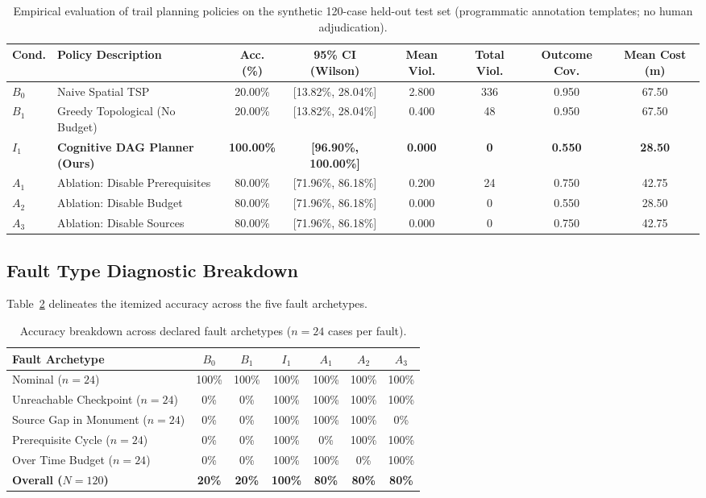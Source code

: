 \documentclass[11pt,a4paper]{article}
\begin{document}
\begin{table}[t]
\centering
\small
\caption{Empirical evaluation of trail planning policies on the synthetic 120-case held-out test set (programmatic annotation templates; no human adjudication).}
\label{tab:holdout_results}
\begin{tabular}{llcccccc}
\toprule
\textbf{Cond.} & \textbf{Policy Description} & \textbf{Acc. (\%)} & \textbf{95\% CI (Wilson)} & \textbf{Mean Viol.} & \textbf{Total Viol.} & \textbf{Outcome Cov.} & \textbf{Mean Cost (m)} \\
\midrule
$B_0$ & Naive Spatial TSP & 20.00\% & [13.82\%, 28.04\%] & 2.800 & 336 & 0.950 & 67.50 \\
$B_1$ & Greedy Topological (No Budget) & 20.00\% & [13.82\%, 28.04\%] & 0.400 & 48 & 0.950 & 67.50 \\
\textbf{$I_1$} & \textbf{Cognitive DAG Planner (Ours)} & \textbf{100.00\%} & \textbf{[96.90\%, 100.00\%]} & \textbf{0.000} & \textbf{0} & \textbf{0.550} & \textbf{28.50} \\
$A_1$ & Ablation: Disable Prerequisites & 80.00\% & [71.96\%, 86.18\%] & 0.200 & 24 & 0.750 & 42.75 \\
$A_2$ & Ablation: Disable Budget & 80.00\% & [71.96\%, 86.18\%] & 0.000 & 0 & 0.550 & 28.50 \\
$A_3$ & Ablation: Disable Sources & 80.00\% & [71.96\%, 86.18\%] & 0.000 & 0 & 0.750 & 42.75 \\
\bottomrule
\end{tabular}
\end{table}

\subsection{Fault Type Diagnostic Breakdown}
Table~\ref{tab:fault_breakdown} delineates the itemized accuracy across the five fault archetypes.

\begin{table}[ht]
\centering
\small
\caption{Accuracy breakdown across declared fault archetypes ($n=24$ cases per fault).}
\label{tab:fault_breakdown}
\begin{tabular}{lcccccc}
\toprule
\textbf{Fault Archetype} & \textbf{$B_0$} & \textbf{$B_1$} & \textbf{$I_1$} & \textbf{$A_1$} & \textbf{$A_2$} & \textbf{$A_3$} \\
\midrule
Nominal ($n=24$) & 100\% & 100\% & 100\% & 100\% & 100\% & 100\% \\
Unreachable Checkpoint ($n=24$) & 0\% & 0\% & 100\% & 100\% & 100\% & 100\% \\
Source Gap in Monument ($n=24$) & 0\% & 0\% & 100\% & 100\% & 100\% & 0\% \\
Prerequisite Cycle ($n=24$) & 0\% & 0\% & 100\% & 0\% & 100\% & 100\% \\
Over Time Budget ($n=24$) & 0\% & 0\% & 100\% & 100\% & 0\% & 100\% \\
\midrule
\textbf{Overall ($N=120$)} & \textbf{20\%} & \textbf{20\%} & \textbf{100\%} & \textbf{80\%} & \textbf{80\%} & \textbf{80\%} \\
\bottomrule
\end{tabular}
\end{table}
\end{document}

